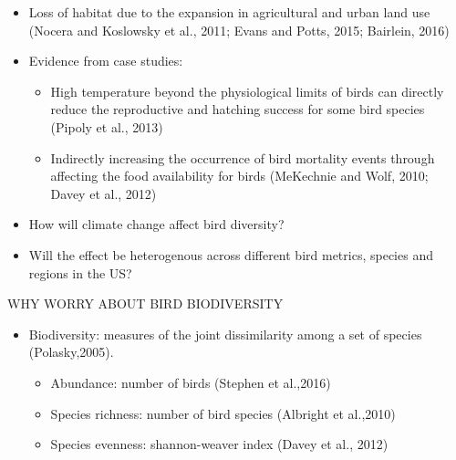 \documentclass[handout]{beamer}
\begin{document}
\begin{frame}
\begin{itemize}
  \item Loss of habitat due to the expansion in agricultural and urban land use (Nocera and Koslowsky et al., 2011; Evans and Potts, 2015; Bairlein, 2016)
  \item Evidence from case studies:
  \begin{itemize}
  \item High temperature beyond the physiological limits of birds can directly reduce the reproductive and hatching success for some bird species (Pipoly et al., 2013)
  \item Indirectly increasing the occurrence of bird mortality events through affecting the food availability for birds (MeKechnie and Wolf, 2010; Davey et al., 2012)
   \end{itemize}
\end{itemize}
\end{frame}

\begin{frame}
  \begin{itemize}
    \item How will climate change affect bird diversity?
    \item Will the effect be heterogenous across different bird metrics, species and regions in the US?
  \end{itemize}
\end{frame}

\begin{frame}{WHY WORRY ABOUT BIRD BIODIVERSITY}
  \begin{itemize}
    \item Biodiversity: measures of the joint dissimilarity among a set of species (Polasky,2005).
    \begin{itemize}
      \item Abundance: number of birds (Stephen et al.,2016)
      \item Species richness: number of bird species (Albright et al.,2010)
      \item Species evenness: shannon-weaver index (Davey et al., 2012)
    \end{itemize}
  \end{itemize}
\end{frame}
\end{document}
